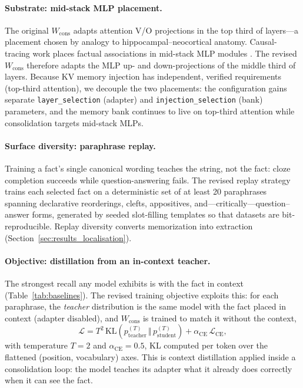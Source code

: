 \paragraph{Substrate: mid-stack MLP placement.} The original $W_{\mathrm{cons}}$ adapts attention V/O projections in the top third of layers---a placement chosen by analogy to hippocampal--neocortical anatomy. Causal-tracing work places factual associations in mid-stack MLP modules \citep{geva2021transformer,meng2022rome,meng2023memit}. The revised $W_{\mathrm{cons}}$ therefore adapts the MLP up- and down-projections of the middle third of layers. Because KV memory injection has independent, verified requirements (top-third attention), we decouple the two placements: the configuration gains separate \texttt{layer\_selection} (adapter) and \texttt{injection\_selection} (bank) parameters, and the memory bank continues to live on top-third attention while consolidation targets mid-stack MLPs.

\paragraph{Surface diversity: paraphrase replay.} Training a fact's single canonical wording teaches the string, not the fact: cloze completion succeeds while question-answering fails. The revised replay strategy trains each selected fact on a deterministic set of at least 20 paraphrases spanning declarative reorderings, clefts, appositives, and---critically---question--answer forms, generated by seeded slot-filling templates so that datasets are bit-reproducible. Replay diversity converts memorization into extraction (Section~\ref{sec:results_localisation}).

\paragraph{Objective: distillation from an in-context teacher.} The strongest recall any model exhibits is with the fact in context (Table~\ref{tab:baselines}). The revised training objective exploits this: for each paraphrase, the \emph{teacher} distribution is the same model with the fact placed in context (adapter disabled), and $W_{\mathrm{cons}}$ is trained to match it without the context,
\begin{equation}
\label{eq:distill}
\mathcal{L} = T^{2}\, \mathrm{KL}\!\left(p_{\mathrm{teacher}}^{(T)} \,\Vert\, p_{\mathrm{student}}^{(T)}\right) + \alpha_{\mathrm{CE}}\, \mathcal{L}_{\mathrm{CE}},
\end{equation}
with temperature $T=2$ and $\alpha_{\mathrm{CE}}=0.5$, KL computed per token over the flattened (position, vocabulary) axes. This is context distillation applied inside a consolidation loop: the model teaches its adapter what it already does correctly when it can see the fact.

